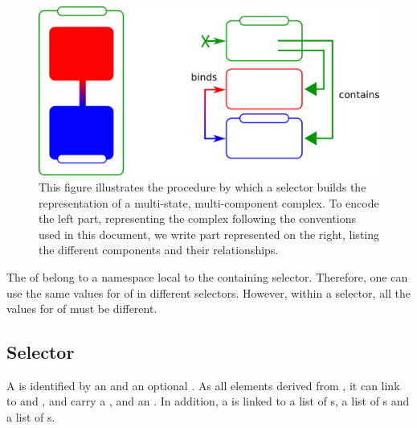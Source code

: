 \begin{figure}[H]
\begin{center}
\includegraphics[scale=0.5]{figs/pngs/selectorBuilding.png}
\caption{This figure illustrates the procedure by which a selector builds the representation of a multi-state, multi-component complex. To encode the left part, representing the complex following the conventions used in this document, we write part represented on the right, listing the different components and their relationships.}
\label{fig:selectorBuilding}
\end{center}
\end{figure}

The  of  belong to a namespace local to the containing selector. Therefore, one can use the same values for  of  in different selectors. However, within a selector, all the values for  of  must be different.

\subsection{Selector}

A  is identified by an  and an optional . As all elements derived from , it can link to  and , and carry a , and an . In addition, a  is linked to a list of s, a list of s and  a list of  s.

